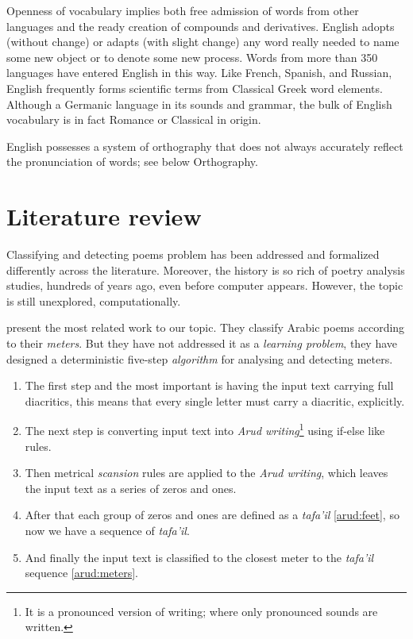 \documentclass[12pt]{report}
\begin{document}
Openness of vocabulary implies both free admission of words from other languages
and the ready creation of compounds and derivatives. English adopts (without
change) or adapts (with slight change) any word really needed to name some new
object or to denote some new process. Words from more than 350 languages have
entered English in this way. Like French, Spanish, and Russian, English
frequently forms scientific terms from Classical Greek word elements. Although a
Germanic language in its sounds and grammar, the bulk of English vocabulary is in
fact Romance or Classical in origin.

English possesses a system of orthography that does not always accurately reflect
the pronunciation of words; see below Orthography.




\section*{Literature review}


Classifying and detecting poems problem has been addressed and formalized
differently across the literature. Moreover, the history is so rich of poetry
analysis studies, hundreds of years ago, even before computer appears. However,
the topic is still unexplored, computationally. 


\citet{Abuata} present the most related work to our topic. They classify
Arabic poems according to their \textit{meters}.  But they have not addressed it
as a \textit{learning problem}, they have designed a deterministic
five-step \textit{algorithm} for analysing  and detecting meters. 


\begin{enumerate}
\item The first step and the most important is having the input text carrying
    full diacritics, this means that every single letter must carry a diacritic,
    explicitly.
\item The next step is converting input text into \textit{Arud
    writing}\footnote{It is a pronounced version of writing; where only pronounced
    sounds are written.} using if-else like rules.
\item Then metrical \textit{scansion} rules are applied to the \textit{Arud
    writing}, which leaves the input text as a series of zeros and ones. 
\item After that each group of zeros and ones are defined as a \textit{tafa'il}
    \ref{arud:feet}, so now we have a sequence of \textit{tafa'il}.

\item And finally  the input text is classified to the closest meter to the
    \textit{tafa'il} sequence \ref{arud:meters}.
\end{enumerate}
\end{document}
